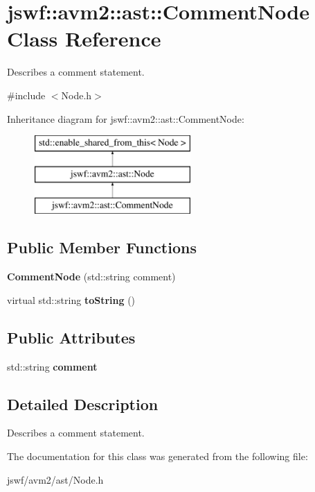 \hypertarget{classjswf_1_1avm2_1_1ast_1_1_comment_node}{\section{jswf\+:\+:avm2\+:\+:ast\+:\+:Comment\+Node Class Reference}
\label{classjswf_1_1avm2_1_1ast_1_1_comment_node}
}


Describes a comment statement.  




{\ttfamily \#include $<$Node.\+h$>$}

Inheritance diagram for jswf\+:\+:avm2\+:\+:ast\+:\+:Comment\+Node\+:\begin{figure}[H]
\begin{center}
\leavevmode
\includegraphics[height=3.000000cm]{classjswf_1_1avm2_1_1ast_1_1_comment_node}
\end{center}
\end{figure}
\subsection*{Public Member Functions}
\begin{DoxyCompactItemize}
\item 
\hypertarget{classjswf_1_1avm2_1_1ast_1_1_comment_node_adca471d5e1747ea23ac7a8ab838b7fab}{{\bfseries Comment\+Node} (std\+::string comment)}\label{classjswf_1_1avm2_1_1ast_1_1_comment_node_adca471d5e1747ea23ac7a8ab838b7fab}

\item 
\hypertarget{classjswf_1_1avm2_1_1ast_1_1_comment_node_a05c1d501f06fb65038d604d62caf7abb}{virtual std\+::string {\bfseries to\+String} ()}\label{classjswf_1_1avm2_1_1ast_1_1_comment_node_a05c1d501f06fb65038d604d62caf7abb}

\end{DoxyCompactItemize}
\subsection*{Public Attributes}
\begin{DoxyCompactItemize}
\item 
\hypertarget{classjswf_1_1avm2_1_1ast_1_1_comment_node_a90f211335c9b387e51ca632d6ed4ac42}{std\+::string {\bfseries comment}}\label{classjswf_1_1avm2_1_1ast_1_1_comment_node_a90f211335c9b387e51ca632d6ed4ac42}

\end{DoxyCompactItemize}


\subsection{Detailed Description}
Describes a comment statement. 

The documentation for this class was generated from the following file\+:\begin{DoxyCompactItemize}
\item 
jswf/avm2/ast/Node.\+h\end{DoxyCompactItemize}
